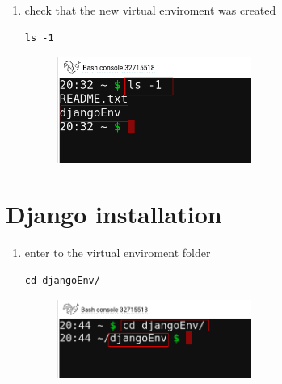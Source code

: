 \documentclass[12pt]{article}
\begin{document}
\begin{enumerate}
    \item check that the  new virtual enviroment was created
			\begin{lstlisting}[caption=\phantom{},style=conlst,label={lst:enter_desktop}]
      ls -1
			\end{lstlisting}
	\begin{figure}[H]
		\centering
		\includegraphics[width=0.6\textwidth ,keepaspectratio]{imgs/check_venv_creation.png}
		\caption{}
	\end{figure}
	\end{enumerate}

\section{Django installation}
	\begin{enumerate}
    \item enter to the virtual enviroment folder
			\begin{lstlisting}[caption=\phantom{},style=conlst,label={lst:enter_desktop}]
      cd djangoEnv/
			\end{lstlisting}
	\begin{figure}[H]
		\centering
		\includegraphics[width=0.6\textwidth ,keepaspectratio]{imgs/enter_venv_folder.png}
		\caption{}
	\end{figure}
	\end{enumerate}
  
\end{document}
